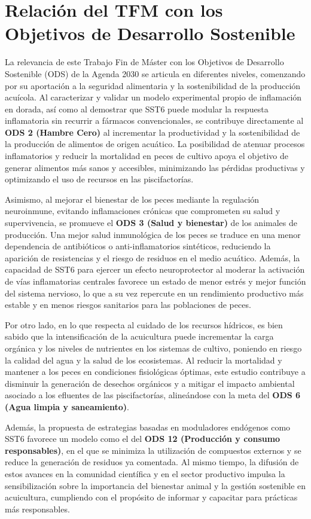\documentclass[10pt,a4paper]{article}
\begin{document}
\section{Relación del TFM con los Objetivos de Desarrollo Sostenible }
La relevancia de este Trabajo Fin de Máster con los Objetivos de Desarrollo Sostenible (ODS) de la Agenda 2030 se articula en diferentes niveles, comenzando por su aportación a la seguridad alimentaria y la sostenibilidad de la producción acuícola. Al caracterizar y validar un modelo experimental propio de inflamación en dorada, así como al demostrar que SST6 puede modular la respuesta inflamatoria sin recurrir a fármacos convencionales, se contribuye directamente al  \textbf{ODS 2 (Hambre Cero)} al incrementar la productividad y la sostenibilidad de la producción de alimentos de origen acuático. La posibilidad de atenuar procesos inflamatorios y reducir la mortalidad en peces de cultivo apoya el objetivo de generar alimentos más sanos y accesibles, minimizando las pérdidas productivas y optimizando el uso de recursos en las piscifactorías.

Asimismo, al mejorar el bienestar de los peces mediante la regulación neuroinmune, evitando inflamaciones crónicas que comprometen su salud y supervivencia, se promueve el  \textbf{ODS 3 (Salud y bienestar)} de los animales de producción. Una mejor salud inmunológica de los peces se traduce en una menor dependencia de antibióticos o anti-inflamatorios sintéticos, reduciendo la aparición de resistencias y el riesgo de residuos en el medio acuático. Además, la capacidad de SST6 para ejercer un efecto neuroprotector al moderar la activación de vías inflamatorias centrales favorece un estado de menor estrés y mejor función del sistema nervioso, lo que a su vez repercute en un rendimiento productivo más estable y en menos riesgos sanitarios para las poblaciones de peces. 

Por otro lado, en lo que respecta al cuidado de los recursos hídricos, es bien sabido que la intensificación de la acuicultura puede incrementar la carga orgánica y los niveles de nutrientes en los sistemas de cultivo, poniendo en riesgo la calidad del agua y la salud de los ecosistemas. Al reducir la mortalidad y mantener a los peces en condiciones fisiológicas óptimas, este estudio contribuye a disminuir la generación de desechos orgánicos y a mitigar el impacto ambiental asociado a los efluentes de las piscifactorías, alineándose con la meta del  \textbf{ODS 6 (Agua limpia y saneamiento)}.

Además, la propuesta de estrategias basadas en moduladores endógenos como SST6 favorece un modelo como el del  \textbf{ODS 12 (Producción y consumo responsables)}, en el que se minimiza la utilización de compuestos externos y se reduce la generación de residuos ya comentada. Al mismo tiempo, la difusión de estos avances en la comunidad científica y en el sector productivo impulsa la sensibilización sobre la importancia del bienestar animal y la gestión sostenible en acuicultura, cumpliendo con el propósito de informar y capacitar para prácticas más responsables.
\end{document}
